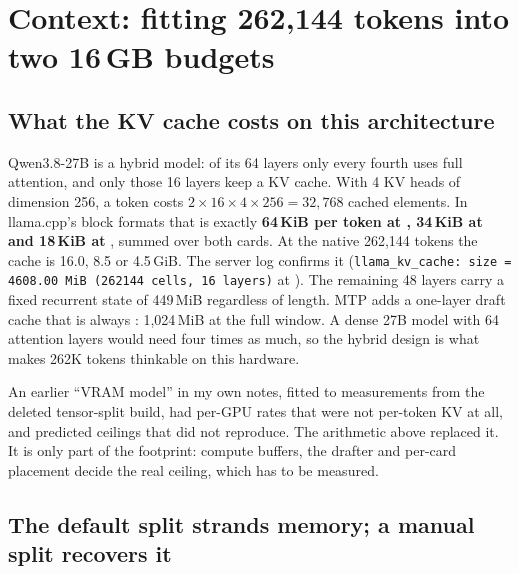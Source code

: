\section{Context: fitting 262{,}144 tokens into two 16\,GB budgets}\label{sec:context}

\subsection{What the KV cache costs on this architecture}
Qwen3.8-27B is a hybrid model: of its 64 layers only every fourth uses full attention, and only those
16 layers keep a KV cache. With 4 KV heads of dimension 256, a token costs $2\times16\times4\times256
= 32{,}768$ cached elements. In llama.cpp's block formats that is exactly \textbf{64\,KiB per token at
, 34\,KiB at  and 18\,KiB at }, summed over both cards. At the native
262{,}144 tokens the cache is 16.0, 8.5 or 4.5\,GiB. The server log confirms it
(\texttt{llama\_kv\_cache: size = 4608.00 MiB (262144 cells, 16 layers)} at ). The
remaining 48 layers carry a fixed recurrent state of 449\,MiB regardless of length. MTP adds a
one-layer draft cache that is always : 1{,}024\,MiB at the full window. A dense 27B model
with 64 attention layers would need four times as much, so the hybrid design is what makes 262K tokens
thinkable on this hardware.

An earlier ``VRAM model'' in my own notes, fitted to measurements from the deleted tensor-split build,
had per-GPU rates that were not per-token KV at all, and predicted ceilings that did not reproduce. The
arithmetic above replaced it. It is only part of the footprint: compute buffers, the drafter and
per-card placement decide the real ceiling, which has to be measured.

\subsection{The default split strands memory; a manual split recovers it}\label{sec:ts}

